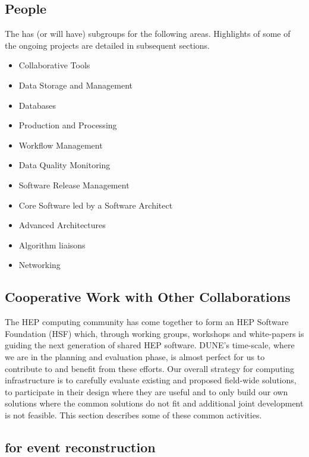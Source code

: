 \subsection{People}

The  has (or will have) subgroups for the following areas.  Highlights of some of the ongoing projects are detailed in subsequent sections. 

\begin{itemize}
    \item 
Collaborative Tools
\item Data Storage and Management
\item Databases 
\item Production and Processing 
\item Workflow Management
\item Data Quality Monitoring 
\item Software Release Management 
\item Core Software led by a Software Architect
\item Advanced Architectures
\item Algorithm liaisons
\item Networking
\end{itemize}
\subsection{Cooperative Work with Other Collaborations}
\label{ch:exec-comp-gov-coop}

The HEP computing community has come together to form an HEP Software Foundation (HSF) which, through working groups, workshops and white-papers is guiding the next generation of shared HEP software.  DUNE's time-scale, where we are in the planning and evaluation phase, is almost perfect for us to contribute to and benefit from these efforts.  Our overall strategy for computing infrastructure is to carefully evaluate existing and proposed field-wide solutions, to participate in their design where they are useful and to only build our own solutions where the common solutions do not fit and additional joint development is not feasible.   This section describes some of these common activities. 



\subsection{ for event reconstruction}

